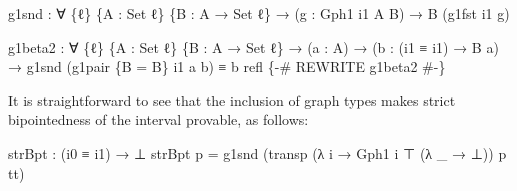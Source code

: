 \documentclass[
  12pt]{article}
\newenvironment{Shaded}{\begin{snugshade}}{\end{snugshade}}
\newcommand{\DataTypeTok}[1]{\textcolor[rgb]{0.00,0.34,0.68}{#1}}
\newcommand{\NormalTok}[1]{\textcolor[rgb]{0.12,0.11,0.11}{#1}}
\newcommand{\OtherTok}[1]{\textcolor[rgb]{0.00,0.43,0.16}{#1}}
\newcommand{\PreprocessorTok}[1]{\textcolor[rgb]{0.00,0.43,0.16}{#1}}
\begin{document}
\begin{Shaded}
\begin{Highlighting}[]
\NormalTok{    g1snd }\OtherTok{:} \OtherTok{∀} \OtherTok{\{}\NormalTok{ℓ}\OtherTok{\}} \OtherTok{\{}\NormalTok{A }\OtherTok{:} \DataTypeTok{Set}\NormalTok{ ℓ}\OtherTok{\}} \OtherTok{\{}\NormalTok{B }\OtherTok{:}\NormalTok{ A }\OtherTok{→} \DataTypeTok{Set}\NormalTok{ ℓ}\OtherTok{\}}
            \OtherTok{→} \OtherTok{(}\NormalTok{g }\OtherTok{:}\NormalTok{ Gph1 i1 A B}\OtherTok{)} \OtherTok{→}\NormalTok{ B }\OtherTok{(}\NormalTok{g1fst i1 g}\OtherTok{)}
    
\NormalTok{    g1beta2 }\OtherTok{:} \OtherTok{∀} \OtherTok{\{}\NormalTok{ℓ}\OtherTok{\}} \OtherTok{\{}\NormalTok{A }\OtherTok{:} \DataTypeTok{Set}\NormalTok{ ℓ}\OtherTok{\}} \OtherTok{\{}\NormalTok{B }\OtherTok{:}\NormalTok{ A }\OtherTok{→} \DataTypeTok{Set}\NormalTok{ ℓ}\OtherTok{\}}
              \OtherTok{→} \OtherTok{(}\NormalTok{a }\OtherTok{:}\NormalTok{ A}\OtherTok{)} \OtherTok{→} \OtherTok{(}\NormalTok{b }\OtherTok{:} \OtherTok{(}\NormalTok{i1 ≡ i1}\OtherTok{)} \OtherTok{→}\NormalTok{ B a}\OtherTok{)}
              \OtherTok{→}\NormalTok{ g1snd }\OtherTok{(}\NormalTok{g1pair }\OtherTok{\{}\NormalTok{B }\OtherTok{=}\NormalTok{ B}\OtherTok{\}}\NormalTok{ i1 a b}\OtherTok{)}\NormalTok{ ≡ b refl}
    \PreprocessorTok{\{{-}\# REWRITE g1beta2 \#{-}\}}
\end{Highlighting}
\end{Shaded}

It is straightforward to see that the inclusion of graph types makes
strict bipointedness of the interval provable, as follows:

\begin{Shaded}
\begin{Highlighting}[]
\NormalTok{strBpt }\OtherTok{:} \OtherTok{(}\NormalTok{i0 ≡ i1}\OtherTok{)} \OtherTok{→}\NormalTok{ ⊥}
\NormalTok{strBpt p }\OtherTok{=}\NormalTok{ g1snd }\OtherTok{(}\NormalTok{transp }\OtherTok{(λ}\NormalTok{ i }\OtherTok{→}\NormalTok{ Gph1 i ⊤ }\OtherTok{(λ} \OtherTok{\_} \OtherTok{→}\NormalTok{ ⊥}\OtherTok{))}\NormalTok{ p tt}\OtherTok{)}
\end{Highlighting}
\end{Shaded}
\end{document}

